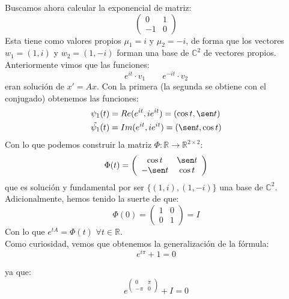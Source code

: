 \begin{ejemplo}
    Buscamos ahora calcular la exponencial de matriz:
    \begin{equation*}
        \left(\begin{array}{cc}
                0 & 1 \\
                -1 & 0
        \end{array}\right)
    \end{equation*}
    Esta tiene como valores propios $\mu_1 = i$ y $\mu_2 = -i$, de forma que los vectores $w_1=(1,i)$ y $w_2=(1,-i)$ forman una base de $\mathbb{C}^2$ de vectores propios. Anteriormente vimos que las funciones:
    \begin{equation*}
        e^{it}\cdot v_1 \qquad e^{-it} \cdot v_2
    \end{equation*}
    eran solución de $x'=Ax$. Con la primera (la segunda se obtiene con el conjugado) obtenemos las funciones:
    \begin{align*}
        \psi_1(t) &= Re(e^{it}, ie^{it}) = (\cos t, \sen t) \\
        \tilde{\psi_1}(t) &= Im(e^{it}, ie^{it})  = (\sen t, \cos t)
    \end{align*}
    Con lo que podemos construir la matriz $\Phi:\mathbb{R}\rightarrow\mathbb{R}^{2\times 2}$:
    \begin{equation*}
        \Phi(t) = \left(\begin{array}{cc}
                \cos t & \sen t \\
                -\sen t & \cos t 
        \end{array}\right)
    \end{equation*}
    que es solución y fundamental por ser $\{(1,i),(1,-i)\}$ una base de $\mathbb{C}^2$. Adicionalmente, hemos tenido la suerte de que:
    \begin{equation*}
        \Phi(0) = \left(\begin{array}{cc}
                1 & 0 \\
                0 & 1
        \end{array}\right) = I
    \end{equation*}
    Con lo que $e^{tA} = \Phi(t)$ $\forall t\in \mathbb{R}$.\\

    Como curiosidad, vemos que obtenemos la generalización de la fórmula:
    \begin{equation*}
        e^{i\pi} +1 = 0
    \end{equation*}

    ya que:
    \begin{equation*}
        e^{\begin{pmatrix}
        0 & \pi \\
        -\pi & 0
        \end{pmatrix}} +I=0
    \end{equation*}
\end{ejemplo}

